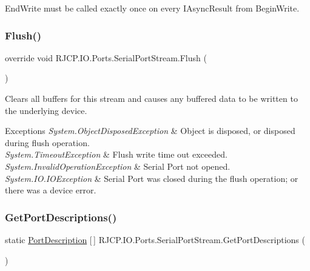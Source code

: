 End\+Write must be called exactly once on every I\+Async\+Result from Begin\+Write. \mbox{\label{class_r_j_c_p_1_1_i_o_1_1_ports_1_1_serial_port_stream_aa748156919e799bfe594e2236ea9ede8}} 
\subsubsection{\texorpdfstring{Flush()}{Flush()}}
{\footnotesize\ttfamily override void R\+J\+C\+P.\+I\+O.\+Ports.\+Serial\+Port\+Stream.\+Flush (\begin{DoxyParamCaption}{ }\end{DoxyParamCaption})}



Clears all buffers for this stream and causes any buffered data to be written to the underlying device. 


\begin{DoxyExceptions}{Exceptions}
{\em System.\+Object\+Disposed\+Exception} & Object is disposed, or disposed during flush operation.\\
\hline
{\em System.\+Timeout\+Exception} & Flush write time out exceeded.\\
\hline
{\em System.\+Invalid\+Operation\+Exception} & Serial Port not opened.\\
\hline
{\em System.\+I\+O.\+I\+O\+Exception} & Serial Port was closed during the flush operation; or there was a device error.\\
\hline
\end{DoxyExceptions}
\mbox{\label{class_r_j_c_p_1_1_i_o_1_1_ports_1_1_serial_port_stream_a5f5f2fe99ac4c0b523534608cf920ead}} 
\subsubsection{\texorpdfstring{GetPortDescriptions()}{GetPortDescriptions()}}
{\footnotesize\ttfamily static \mbox{\hyperlink{class_r_j_c_p_1_1_i_o_1_1_ports_1_1_port_description}{Port\+Description}} \mbox{[}$\,$\mbox{]} R\+J\+C\+P.\+I\+O.\+Ports.\+Serial\+Port\+Stream.\+Get\+Port\+Descriptions (\begin{DoxyParamCaption}{ }\end{DoxyParamCaption})\hspace{0.3cm}{\ttfamily [static]}}



